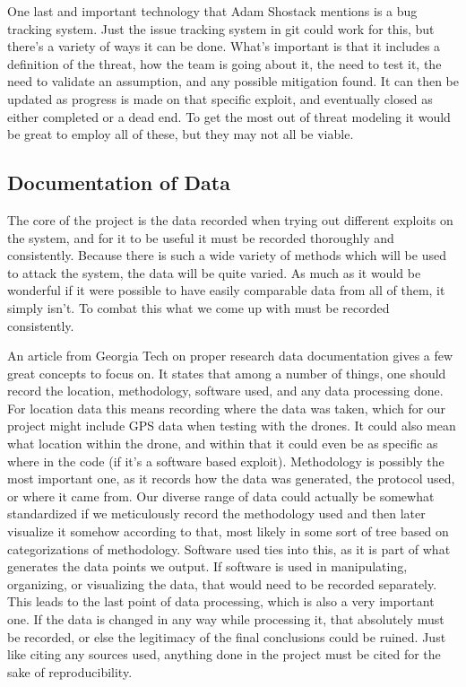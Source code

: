 \documentclass[IEEEtran,letterpaper,10pt,titlepage,draftclsnofoot,onecolumn]{article}
\begin{document}
One last and important technology that Adam Shostack mentions is a bug tracking system.
Just the issue tracking system in git could work for this, but there's a variety of ways it can be done. 
What's important is that it includes a definition of the threat, how the team is going about it, the need to test it, the need to validate an assumption, and any possible mitigation found. \cite[p.205]{TMDS}
It can then be updated as progress is made on that specific exploit, and eventually closed as either completed or a dead end.
To get the most out of threat modeling it would be great to employ all of these, but they may not all be viable.

\subsection*{Documentation of Data}
The core of the project is the data recorded when trying out different exploits on the system, and for it to be useful it must be recorded thoroughly and consistently. 
Because there is such a wide variety of methods which will be used to attack the system, the data will be quite varied. 
As much as it would be wonderful if it were possible to have easily comparable data from all of them, it simply isn't. 
To combat this what we come up with must be recorded consistently.

An article from Georgia Tech on proper research data documentation gives a few great concepts to focus on. \cite{GTDD}
It states that among a number of things, one should record the location, methodology, software used, and any data processing done. 
For location data this means recording where the data was taken, which for our project might include GPS data when testing with the drones. 
It could also mean what location within the drone, and within that it could even be as specific as where in the code (if it's a software based exploit).
Methodology is possibly the most important one, as it records how the data was generated, the protocol used, or where it came from.
Our diverse range of data could actually be somewhat standardized if we meticulously record the methodology used and then later visualize it somehow according to that, most likely in some sort of tree based on categorizations of methodology. 
Software used ties into this, as it is part of what generates the data points we output. 
If software is used in manipulating, organizing, or visualizing the data, that  would need to be recorded separately. 
This leads to the last point of data processing, which is also a very important one.
If the data is changed in any way while processing it, that absolutely must be recorded, or else the legitimacy of the final conclusions could be ruined.
Just like citing any sources used, anything done in the project must be cited for the sake of reproducibility.
\end{document}
